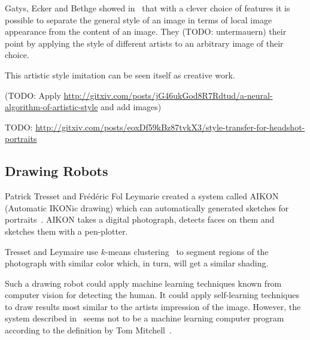 Gatys, Ecker and Bethge showed in~\cite{gatys2015neural} that with a clever
choice of features it is possible to separate the general style of an image in
terms of local image appearance from the content of an image. They (TODO:
untermauern) their point by applying the style of different artists to an
arbitrary image of their choice.

This artistic style imitation can be seen itself as creative work.

(TODO: Apply \href{http://gitxiv.com/posts/jG46ukGod8R7Rdtud/a-neural-algorithm-of-artistic-style}{http://gitxiv.com/posts/jG46ukGod8R7Rdtud/a-neural-algorithm-of-artistic-style} and add images)



TODO: \cite{shih2014style} \href{http://gitxiv.com/posts/eoxDf59kBz87tvkX3/style-transfer-for-headshot-portraits}{http://gitxiv.com/posts/eoxDf59kBz87tvkX3/style-transfer-for-headshot-portraits}


\subsection{Drawing Robots}
Patrick Tresset and Frédéric Fol Leymarie created a system called AIKON
(Automatic IKONic drawing) which can automatically generated sketches for
portraits~\cite{tresset2005generative}. AIKON takes a digital photograph,
detects faces on them and sketches them with a pen-plotter.

Tresset and Leymaire use $k$-means clustering~\cite{1017616} to segment regions
of the photograph with similar color which, in turn, will get a similar
shading.

Such a drawing robot could apply machine learning techniques known from
computer vision for detecting the human. It could apply self-learning
techniques to draw results most similar to the artists impression of the image.
However, the system described in~\cite{tresset2005generative} seems not to be a
machine learning computer program according to the definition by Tom
Mitchell~\cite{Mitchell97}.

